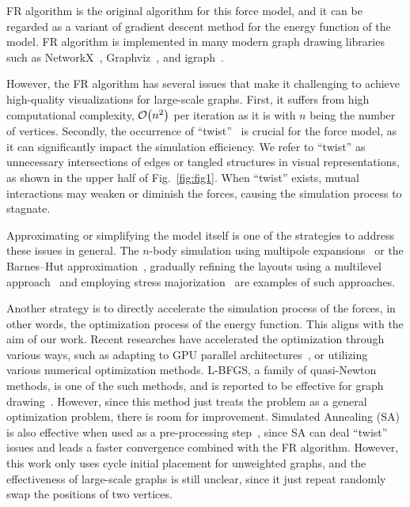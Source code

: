 \documentclass[dvipdfmx,10pt,journal,compsoc]{IEEEtran}
\begin{document}
FR algorithm is the original algorithm for this force model, and it can be regarded as a variant of gradient descent method for the energy function of the model.
FR algorithm is implemented in many modern graph drawing libraries such as NetworkX~\cite{hagberg2008exploring}, Graphviz~\cite{ellsonGraphvizOpenSource2002}, and igraph~\cite{csardiIgraphSoftwarePackage2006}.

However, the FR algorithm has several issues that make it challenging to achieve high-quality visualizations for large-scale graphs.
First, it suffers from high computational complexity, $\order{n^2}$ per iteration as it is with $n$ being the number of vertices.
Secondly, the occurrence of ``twist''~\cite{cheongSnapshotVisualizationComplex2018} is crucial for the force model, as it can significantly impact the simulation efficiency.
We refer to ``twist'' as unnecessary intersections of edges or tangled structures in visual representations, as shown in the upper half of Fig.~\ref{fig:fig1}.
When ``twist'' exists, mutual interactions may weaken or diminish the forces, causing the simulation process to stagnate.

Approximating or simplifying the model itself is one of the strategies to address these issues in general.
The $n$-body simulation using multipole expansions~\cite{greengardFastAlgorithmParticle1987} or the Barnes--Hut approximation~\cite{barnesHierarchicalLogForcecalculation1986}, gradually refining the layouts using a multilevel approach~\cite{Hu2006EfficientHF} and employing stress majorization~\cite{gansnerGraphDrawingStress2005} are examples of such approaches.

Another strategy is to directly accelerate the simulation process of the forces, in other words, the optimization process of the energy function.
This aligns with the aim of our work.
Recent researches have accelerated the optimization through various ways, such as adapting to GPU parallel architectures~\cite{gajdosParallelFruchtermanReingold2016}, or utilizing various numerical optimization methods.
L-BFGS, a family of quasi-Newton methods, is one of the such methods, and is reported to be effective for graph drawing~\cite{6183577}.
However, since this method just treats the problem as a general optimization problem, there is room for improvement.
Simulated Annealing (SA) is also effective when used as a pre-processing step~\cite{ghassemitoosiSimulatedAnnealingPreProcessing2016}, since SA can deal ``twist'' issues and leads a faster convergence combined with the FR algorithm.
However, this work only uses cycle initial placement for unweighted graphs, and the effectiveness of large-scale graphs is still unclear, since it just repeat randomly swap the positions of two vertices.
\end{document}
